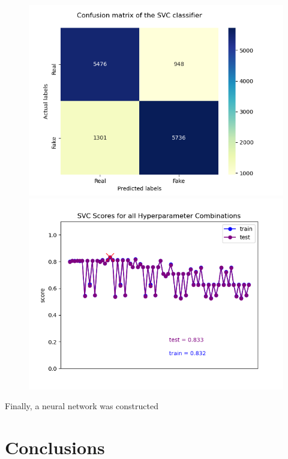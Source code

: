 \documentclass[10pt,twocolumn,letterpaper]{article}
\begin{document}
\begin{figure}[h]
   \begin{center}
        \includegraphics[width=\linewidth]{Latex_Report/report/Graphs/SVC/confusion_matrix.png}
        \includegraphics[width=\linewidth]{Latex_Report/report/Graphs/SVC/scores_plot.png}
   \end{center}
        \vspace*{-5mm}
        \caption{\label{fourth_figure}}
\end{figure}

Finally, a neural network was constructed 

\section{Conclusions}
\end{document}
